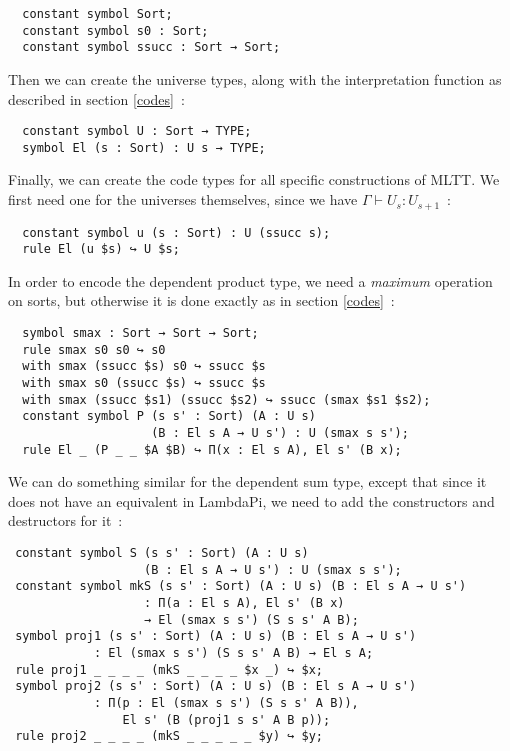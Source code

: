 \begin{lstlisting}
  constant symbol Sort;
  constant symbol s0 : Sort;
  constant symbol ssucc : Sort → Sort;
\end{lstlisting}

Then we can create the universe types, along with the interpretation function as
described in section \ref{codes}~:

\begin{lstlisting}
  constant symbol U : Sort → TYPE;
  symbol El (s : Sort) : U s → TYPE;
\end{lstlisting}

Finally, we can create the code types for all specific constructions of MLTT. We
first need one for the universes themselves, since we have
$\Gamma\vdash U_{s} : U_{s + 1}$~:

\begin{lstlisting}
  constant symbol u (s : Sort) : U (ssucc s);
  rule El (u $s) ↪ U $s;
\end{lstlisting}

In order to encode the dependent product type, we need a \emph{maximum}
operation on sorts, but otherwise it is done exactly as in section \ref{codes}~:

\begin{lstlisting}
  symbol smax : Sort → Sort → Sort;
  rule smax s0 s0 ↪ s0
  with smax (ssucc $s) s0 ↪ ssucc $s
  with smax s0 (ssucc $s) ↪ ssucc $s
  with smax (ssucc $s1) (ssucc $s2) ↪ ssucc (smax $s1 $s2);
  constant symbol P (s s' : Sort) (A : U s)
                    (B : El s A → U s') : U (smax s s');
  rule El _ (P _ _ $A $B) ↪ Π(x : El s A), El s' (B x);
\end{lstlisting}

We can do something similar for the dependent sum type, except that since it
does not have an equivalent in LambdaPi, we need to add the constructors and
destructors for it~:

\begin{lstlisting}
 constant symbol S (s s' : Sort) (A : U s)
                   (B : El s A → U s') : U (smax s s');
 constant symbol mkS (s s' : Sort) (A : U s) (B : El s A → U s')
                   : Π(a : El s A), El s' (B x)
                   → El (smax s s') (S s s' A B);
 symbol proj1 (s s' : Sort) (A : U s) (B : El s A → U s')
            : El (smax s s') (S s s' A B) → El s A;
 rule proj1 _ _ _ _ (mkS _ _ _ _ $x _) ↪ $x;
 symbol proj2 (s s' : Sort) (A : U s) (B : El s A → U s')
            : Π(p : El (smax s s') (S s s' A B)),
                El s' (B (proj1 s s' A B p));
 rule proj2 _ _ _ _ (mkS _ _ _ _ _ $y) ↪ $y;
\end{lstlisting}

